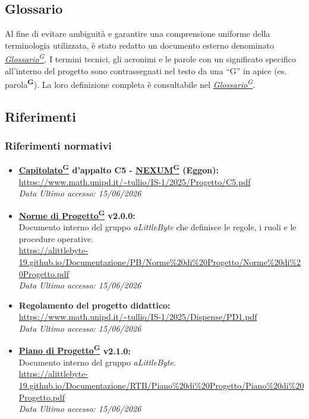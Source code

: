 \documentclass[a4paper,12pt]{article}
\providecommand{\glslink}[2]{\href{https://alittlebyte-19.github.io/Documentazione/glossario.html\#gls-#1}{\underline{#2}\textsuperscript{\scriptsize G}}}
\begin{document}
\subsection{Glossario}
Al fine di evitare ambiguità e garantire una comprensione uniforme della terminologia utilizzata, è stato redatto un documento esterno denominato \textit{\glslink{glossario}{Glossario}}.
I termini tecnici, gli acronimi e le parole con un significato specifico all'interno del progetto sono contrassegnati nel testo da una ``G'' in apice (es. parola\textsuperscript{\scriptsize\textbf{G}}). La loro definizione completa è consultabile nel \textit{\glslink{glossario}{Glossario}}.

\subsection{Riferimenti}
\subsubsection{Riferimenti normativi}
\begin{itemize}
    \item \textbf{\glslink{capitolato}{Capitolato} d'appalto C5 - \glslink{nexum}{NEXUM} (Eggon):}\\
    \url{https://www.math.unipd.it/~tullio/IS-1/2025/Progetto/C5.pdf} \\
    \textit{Data Ultimo accesso: 15/06/2026}

    \item \textbf{\glslink{norme-di-progetto}{Norme di Progetto} v2.0.0:}\\
    Documento interno del gruppo \textit{aLittleByte} che definisce le regole, i ruoli e le procedure operative.\\
    \url{https://alittlebyte-19.github.io/Documentazione/PB/Norme%20di%20Progetto/Norme%20di%20Progetto.pdf}\\
    \textit{Data Ultimo accesso: 15/06/2026}

    \item \textbf{Regolamento del progetto didattico:}\\
    \url{https://www.math.unipd.it/~tullio/IS-1/2025/Dispense/PD1.pdf}\\
    \textit{Data Ultimo accesso: 15/06/2026}

    \item \textbf{\glslink{piano-di-progetto}{Piano di Progetto} v2.1.0:}\\
    Documento interno del gruppo \textit{aLittleByte}.\\
    \url{https://alittlebyte-19.github.io/Documentazione/RTB/Piano%20di%20Progetto/Piano%20di%20Progetto.pdf}\\
    \textit{Data Ultimo accesso: 15/06/2026}
\end{itemize}
\end{document}
